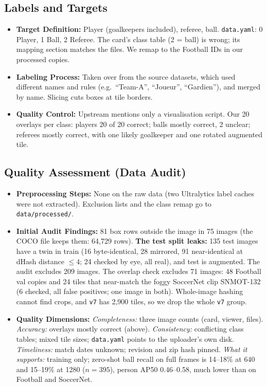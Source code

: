 \documentclass[11pt, a4paper]{article}
\begin{document}
\subsection{Labels and Targets}
\begin{itemize}
    \item \textbf{Target Definition:} Player (goalkeepers included), referee, ball. \texttt{data.yaml}: 0 Player, 1 Ball, 2 Referee. The card's class table (2 = ball) is wrong; its mapping section matches the files. We remap to the Football IDs in our processed copies.
    \item \textbf{Labeling Process:} Taken over from the source datasets, which used different names and rules (e.g.\ ``Team-A'', ``Joueur'', ``Gardien''), and merged by name. Slicing cuts boxes at tile borders.
    \item \textbf{Quality Control:} Upstream mentions only a visualisation script. Our 20 overlays per class: players 20 of 20 correct; balls mostly correct, 2 unclear; referees mostly correct, with one likely goalkeeper and one rotated augmented tile.
\end{itemize}

\subsection{Quality Assessment (Data Audit)}
\begin{itemize}
    \item \textbf{Preprocessing Steps:} None on the raw data (two Ultralytics label caches were not extracted). Exclusion lists and the class remap go to \texttt{data/processed/}.
    \item \textbf{Initial Audit Findings:} 81 box rows outside the image in 75 images (the COCO file keeps them: 64,729 rows). \textbf{The test split leaks:} 135 test images have a twin in train (16 byte-identical, 28 mirrored, 91 near-identical at dHash distance $\le 4$; 24 checked by eye, all real), and test is augmented. The audit excludes 209 images. The overlap check excludes 71 images: 48 Football val copies and 24 tiles that near-match the foggy SoccerNet clip SNMOT-132 (6 checked, all false positives; one image in both). Whole-image hashing cannot find crops, and \texttt{v7} has 2,900 tiles, so we drop the whole \texttt{v7} group.
    \item \textbf{Quality Dimensions:} \emph{Completeness:} three image counts (card, viewer, files). \emph{Accuracy:} overlays mostly correct (above). \emph{Consistency:} conflicting class tables; mixed tile sizes; \texttt{data.yaml} points to the uploader's own disk. \emph{Timeliness:} match dates unknown; revision and zip hash pinned. \emph{What it supports:} training only; zero-shot ball recall on full frames is 14--18\% at 640 and 15--19\% at 1280 ($n=395$), person AP50 0.46--0.58, much lower than on Football and SoccerNet.
\end{itemize}
\end{document}
